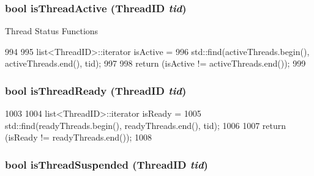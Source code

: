 \hypertarget{classInOrderCPU_aa5e706e11748c9fefd1c679848d0bd44}{
\subsubsection[{isThreadActive}]{\setlength{\rightskip}{0pt plus 5cm}bool isThreadActive ({\bf ThreadID} {\em tid})}}
\label{classInOrderCPU_aa5e706e11748c9fefd1c679848d0bd44}
Thread Status Functions 


\begin{DoxyCode}
994 {
995   list<ThreadID>::iterator isActive =
996       std::find(activeThreads.begin(), activeThreads.end(), tid);
997 
998     return (isActive != activeThreads.end());
999 }
\end{DoxyCode}
\hypertarget{classInOrderCPU_a410e64fde8cec544412d687a0904efb1}{
\subsubsection[{isThreadReady}]{\setlength{\rightskip}{0pt plus 5cm}bool isThreadReady ({\bf ThreadID} {\em tid})}}
\label{classInOrderCPU_a410e64fde8cec544412d687a0904efb1}



\begin{DoxyCode}
1003 {
1004   list<ThreadID>::iterator isReady =
1005       std::find(readyThreads.begin(), readyThreads.end(), tid);
1006 
1007     return (isReady != readyThreads.end());
1008 }
\end{DoxyCode}
\hypertarget{classInOrderCPU_ac32ab10fb7199c0ae6000cb07a19b94f}{
\subsubsection[{isThreadSuspended}]{\setlength{\rightskip}{0pt plus 5cm}bool isThreadSuspended ({\bf ThreadID} {\em tid})}}
\label{classInOrderCPU_ac32ab10fb7199c0ae6000cb07a19b94f}



